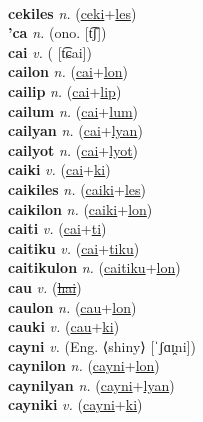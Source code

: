  \label{ceki} \\
\textbf{cekiles} \textit{n.} (\hyperref[ceki]{ceki}+\hyperref[les]{les})
 \label{cekiles} \\
\textbf{'ca} \textit{n.} (ono. [t͡ʃ])
 \label{'ca} \\
\textbf{cai} \textit{v.} ( [t͡ɕai])
 \label{cai} \\
\textbf{cailon} \textit{n.} (\hyperref[cai]{cai}+\hyperref[lon]{lon})
 \label{cailon} \\
\textbf{cailip} \textit{n.} (\hyperref[cai]{cai}+\hyperref[lip]{lip})
 \label{cailip} \\
\textbf{cailum} \textit{n.} (\hyperref[cai]{cai}+\hyperref[lum]{lum})
 \label{cailum} \\
\textbf{cailyan} \textit{n.} (\hyperref[cai]{cai}+\hyperref[lyan]{lyan})
 \label{cailyan} \\
\textbf{cailyot} \textit{n.} (\hyperref[cai]{cai}+\hyperref[lyot]{lyot})
 \label{cailyot} \\
\textbf{caiki} \textit{v.} (\hyperref[cai]{cai}+\hyperref[ki]{ki})
 \label{caiki} \\
\textbf{caikiles} \textit{n.} (\hyperref[caiki]{caiki}+\hyperref[les]{les})
 \label{caikiles} \\
\textbf{caikilon} \textit{n.} (\hyperref[caiki]{caiki}+\hyperref[lon]{lon})
 \label{caikilon} \\
\textbf{caiti} \textit{v.} (\hyperref[cai]{cai}+\hyperref[ti]{ti})
 \label{caiti} \\
\textbf{caitiku} \textit{v.} (\hyperref[cai]{cai}+\hyperref[tiku]{tiku})
 \label{caitiku} \\
\textbf{caitikulon} \textit{n.} (\hyperref[caitiku]{caitiku}+\hyperref[lon]{lon})
 \label{caitikulon} \\
\textbf{cau} \textit{v.} (\hyperref[hai]{\sout{hai}})
 \label{cau} \\
\textbf{caulon} \textit{n.} (\hyperref[cau]{cau}+\hyperref[lon]{lon})
 \label{caulon} \\
\textbf{cauki} \textit{v.} (\hyperref[cau]{cau}+\hyperref[ki]{ki})
 \label{cauki} \\
\textbf{cayni} \textit{v.} (Eng. ⟨shiny⟩ [ˈʃɑɪ̯ni])
 \label{cayni} \\
\textbf{caynilon} \textit{n.} (\hyperref[cayni]{cayni}+\hyperref[lon]{lon})
 \label{caynilon} \\
\textbf{caynilyan} \textit{n.} (\hyperref[cayni]{cayni}+\hyperref[lyan]{lyan})
 \label{caynilyan} \\
\textbf{cayniki} \textit{v.} (\hyperref[cayni]{cayni}+\hyperref[ki]{ki})
